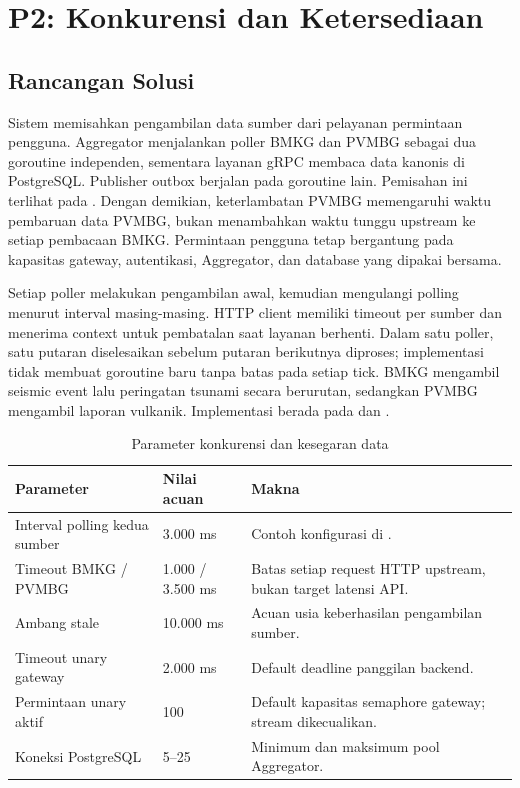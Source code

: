 \chapter{P2: Konkurensi dan Ketersediaan}
\label{chap:p2}

\section{Rancangan Solusi}

Sistem memisahkan pengambilan data sumber dari pelayanan permintaan pengguna.
Aggregator menjalankan poller BMKG dan PVMBG sebagai dua goroutine independen,
sementara layanan gRPC membaca data kanonis di PostgreSQL. Publisher outbox
berjalan pada goroutine lain. Pemisahan ini terlihat pada
. Dengan demikian, keterlambatan PVMBG
memengaruhi waktu pembaruan data PVMBG, bukan menambahkan waktu tunggu upstream
ke setiap pembacaan BMKG. Permintaan pengguna tetap bergantung pada kapasitas
gateway, autentikasi, Aggregator, dan database yang dipakai bersama.

Setiap poller melakukan pengambilan awal, kemudian mengulangi polling menurut
interval masing-masing. HTTP client memiliki timeout per sumber dan menerima
context untuk pembatalan saat layanan berhenti. Dalam satu poller, satu putaran
diselesaikan sebelum putaran berikutnya diproses; implementasi tidak membuat
goroutine baru tanpa batas pada setiap tick. BMKG mengambil seismic event lalu
peringatan tsunami secara berurutan, sedangkan PVMBG mengambil laporan vulkanik.
Implementasi berada pada  dan
.

\begin{table}[htbp]
    \centering
    \small
    \caption{Parameter konkurensi dan kesegaran data}
    \begin{tabularx}{\textwidth}{@{}P{0.30\textwidth}P{0.18\textwidth}X@{}}
        \toprule
        \textbf{Parameter} & \textbf{Nilai acuan} & \textbf{Makna} \\
        \midrule
        Interval polling kedua sumber & 3.000 ms & Contoh konfigurasi di . \\
        Timeout BMKG / PVMBG & 1.000 / 3.500 ms & Batas setiap request HTTP upstream, bukan target latensi API. \\
        Ambang stale & 10.000 ms & Acuan usia keberhasilan pengambilan sumber. \\
        Timeout unary gateway & 2.000 ms & Default deadline panggilan backend. \\
        Permintaan unary aktif & 100 & Default kapasitas semaphore gateway; stream dikecualikan. \\
        Koneksi PostgreSQL & 5--25 & Minimum dan maksimum pool Aggregator. \\
        \bottomrule
    \end{tabularx}
\end{table}

